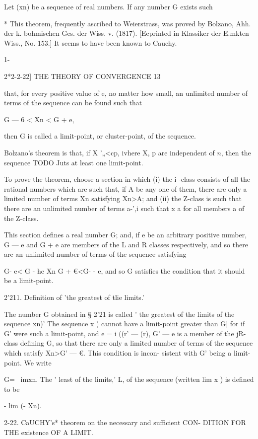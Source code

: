Let (xn) be a sequence of real numbers. If any number G exists such

* This theorem, frequently ascribed to Weierstrass, was proved by
Bolzano, Ahh. der k. bohmischen Ges. der Wiss. v. (1817). [Eeprinted
in Klassiker der E.mkten Wiss., No. 153.] It seems to have been known
to Cauchy.



1-



2*2-2-22] THE THEORY OF CONVERGENCE 13

that, for every positive value of e, no matter how small, an unlimited
number of terms of the sequence can be found such that

G — 6 < Xn < G + e,

then G is called a limit-point, or cluster-point, of the sequence.

Bolzano's theorem is that, if X '„<cp, ivhere X, p are independent of
$n$, then the sequence TODO Juts at least one limit-point.

To prove the theorem, choose a section in which (i) the i -class
consists of all the rational numbers which are such that, if A be any
one of them, there are only a limited number of terms Xn satisfying
Xn>A; and (ii) the Z-class is such that there are an unlimited number
of terms a-',i such that x a for all members a of the Z-class.

This section defines a real number G; and, if e be an arbitrary
positive number, G — e and G + e are members of the L and R classes
respectively, and so there are an unlimited number of terms of the
sequence satisfying

G- e< G - he Xn G + €<G- - e, and so G satisfies the condition that it
should be a limit-point.

2'211. Definition of 'the greatest of tlie limits.'

The number G obtained in § 2'21 is called ' the greatest of the limits
of the sequence xn)' The sequence x ) cannot have a limit-point
greater than G] for if G' were such a limit-point, and e = i ((r' —
(r), G' — e is a member of the jR-class defining G, so that there are
only a limited number of terms of the sequence which satisfy Xn>G' —
€. This condition is incon- sistent with G' being a limit-point. We
write

G= \ imxn. The ' least of the limits,' L, of the sequence (written lim
x ) is defined to be

- lim (- Xn).

2-22. CaUCHY's* theorem on the necessary and sufficient CON- DITION
FOR THE existence OF A LIMIT.

